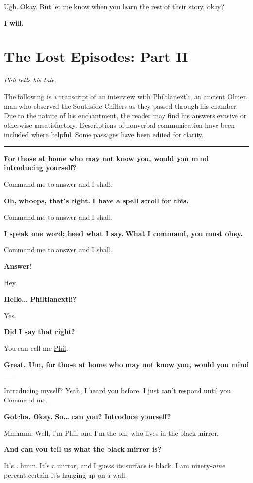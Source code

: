 \documentclass[smalldemyvopaper,11pt,twoside,onecolumn,openright,extrafontsizes]{memoir}
\newcommand{\chapdesc}[1]{
    \begin{flushright}
    \emph{{#1}}
    \end{flushright}
    \vspace{26pt}
}
\begin{document}
Ugh. Okay. But let me know when you learn the rest of their story, okay?

\textbf{I will.}


\chapter{The Lost Episodes: Part II}
\chapdesc{Phil tells his tale.}

The following is a transcript of an interview with Philtlanextli, an
ancient Olmen man who observed the Southside Chillers as they passed
through his chamber. Due to the nature of his enchantment, the reader
may find his answers evasive or otherwise unsatisfactory. Descriptions
of nonverbal communication have been included where helpful. Some
passages have been edited for clarity.

\begin{center}\rule{0.5\linewidth}{\linethickness}\end{center}

\textbf{For those at home who may not know you, would you mind
introducing yourself?}

Command me to answer and I shall.

\textbf{Oh, whoops, that's right. I have a spell scroll for this.}

Command me to answer and I shall.

\textbf{I speak one word; heed what I say.} \textbf{What I command, you
must obey.}

Command me to answer and I shall.

\textbf{Answer!}

Hey.

\textbf{Hello\ldots{} Philtlanextli?}

Yes.

\textbf{Did I say that right?}

You can call me \href{/characters/phil/}{Phil}.

\textbf{Great. Um, for those at home who may not know you, would you
mind---}

Introducing myself? Yeah, I heard you before. I just can't respond until
you Command me.

\textbf{Gotcha. Okay. So\ldots{} can you? Introduce yourself?}

Mmhmm. Well, I'm Phil, and I'm the one who lives in the black mirror.

\textbf{And can you tell us what the black mirror is?}

It's\ldots{} hmm. It's a mirror, and I guess its surface is black. I am
ninety-\emph{nine} percent certain it's hanging up on a wall.
\end{document}
